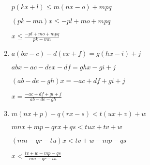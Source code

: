 \documentclass[10pt]{exam}
\begin{document}
\begin{multicols*}{2}
\begin{enumerate}
\( p(kx + l) \leq m(nx - o) + mpq \)

\( (pk - mn)x \leq -pl + mo + mpq \)

\(\displaystyle x \leq \frac{-pl + mo + mpq}{pk - mn} \)

\item \( a(bx - c) - d(ex + f) = g(hx - i) + j \)

\( abx - ac - dex - df = ghx - gi + j \)

\( (ab - de - gh)x = -ac + df + gi + j \)

\(\displaystyle x = \frac{-ac + df + gi + j}{ab - de - gh} \)

\item \( m(nx + p) - q(rx - s) < t(ux + v) + w \)

\( mnx + mp - qrx + qs < tux + tv + w \)

\( (mn - qr - tu)x < tv + w - mp - qs \)

\(\displaystyle x < \frac{tv + w - mp - qs}{mn - qr - tu} \)

\end{enumerate}
\end{multicols*}
\end{document}
